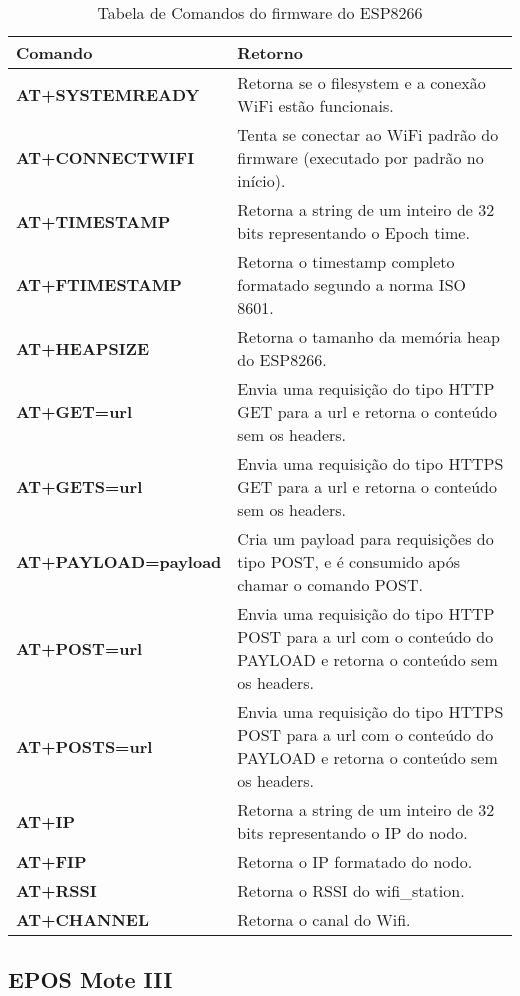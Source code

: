 \documentclass[11pt]{article}
\begin{document}
\begin{table}[!ht]
\centering
\caption{Tabela de Comandos do firmware do ESP8266}
\vspace{0.5cm}
\label{tabela-comandos}
\renewcommand*{\arraystretch}{1.7}
\begin{tabularx}{\linewidth}{|X|X|}
\hline
\textbf{Comando} & \textbf{Retorno} \\
\hline
\textbf{AT+SYSTEMREADY} & Retorna se o filesystem e a conexão WiFi estão funcionais. \\ \hline
\textbf{AT+CONNECTWIFI} & Tenta se conectar ao WiFi padrão do firmware (executado por padrão no início). \\ \hline
\textbf{AT+TIMESTAMP} & Retorna a string de um inteiro de 32 bits representando o Epoch time. \\ \hline
\textbf{AT+FTIMESTAMP} & Retorna o timestamp completo formatado segundo a norma ISO 8601. \\ \hline
\textbf{AT+HEAPSIZE} & Retorna o tamanho da memória heap do ESP8266. \\ \hline
\textbf{AT+GET=url}    & Envia uma requisição do tipo HTTP GET para a url e retorna o conteúdo sem os headers. \\ \hline
\textbf{AT+GETS=url}    & Envia uma requisição do tipo HTTPS GET para a url e retorna o conteúdo sem os headers. \\ \hline
\textbf{AT+PAYLOAD=payload}    & Cria um payload para requisições do tipo POST, e é consumido após chamar o comando POST. \\ \hline
\textbf{AT+POST=url}    & Envia uma requisição do tipo HTTP POST para a url com o conteúdo do PAYLOAD e retorna o conteúdo sem os headers. \\ \hline
\textbf{AT+POSTS=url}    & Envia uma requisição do tipo HTTPS POST para a url com o conteúdo do PAYLOAD e retorna o conteúdo sem os headers. \\ \hline
\textbf{AT+IP}       & Retorna a string de um inteiro de 32 bits representando o IP do nodo. \\ \hline
\textbf{AT+FIP} & Retorna o IP formatado do nodo. \\ \hline
\textbf{AT+RSSI} & Retorna o RSSI do wifi\_station. \\ \hline
\textbf{AT+CHANNEL} & Retorna o canal do Wifi. \\
\hline
\end{tabularx}
\end{table}


\subsection{EPOS Mote III}
\end{document}
